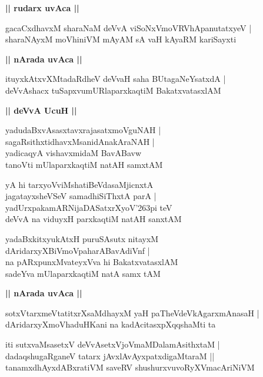 \documentclass[twoside,12pt,openright]{book}
\def\S{\char'263}
\newcounter{shloka}[chapter]
\def\uvaca#1{\centerline{{\large\textbf{#1}}}}
\begin{document}
\uvaca{|| rudarx uvAca ||}

\begin{shloka}%
gacaCxdhavxM sharaNaM deVvA viSoNxVmoVRVhApanutatxyeV |\\
sharaNAyxM moVhiniVM mAyAM sA vaH kAyaRM kariSayxti 
\end{shloka}

\uvaca{|| nArada uvAca ||}

\begin{shloka}%
ituyxkAtxvXMtadaRdheV deVvaH saha BUtagaNeYsatxdA |\\
deVvAshacx tuSapxvumURlaparxkaqtiM BakatxvatasxlAM 
\end{shloka}

\uvaca{|| deVvA UcuH ||}

\begin{shloka}%
yadudaBxvAsasxtavxrajasatxmoVguNAH |\\
sagaRsithxtidhavxMsanidAnakAraNAH |\\
yadicaqyA vishavxmidaM BavABavw \\
tanoVti mUlaparxkaqtiM natAH samxtAM 
\end{shloka}

\begin{shloka}%
yA hi tarxyoVviMshatiBeVdasaMjicnxtA \\
jagatayxsheVSeV samadhiSiThxtA parA |\\
yadUrxpakamARNijaDASatxrXyoV\S pi teV \\
deVvA na viduyxH parxkaqtiM natAH sanxtAM 
\end{shloka}

\begin{shloka}%
yadaBxkitxyukAtxH puruSAsutx nitayxM \\
dAridarxyXBiVmoVpaharABavAdiVnf |\\
na pARxpunxMvateyxVva hi BakatxvatasxlAM \\
sadeYva mUlaparxkaqtiM natA samx tAM
\end{shloka}

\uvaca{|| nArada uvAca ||}

\begin{shloka}%
sotxVtarxmeVtatitxrXsaMdhayxM yaH paTheVdeVkAgarxmAnasaH |\\
dAridarxyXmoVhaduHKani na kadAcitasxpXqqshaMti ta
\end{shloka}

\begin{shloka}%
iti sutxvaMsasetxV deVvAsetxVjoVmaMDalamAsithxtaM |\\
dadaqshugaRganeV tatarx jAvxlAvAyxpatxdigaMtaraM ||\\
tanamxdhAyxdABxratiVM saveRV shushurxvuvoRyXVmacAriNiVM 
\end{shloka}
\end{document}
